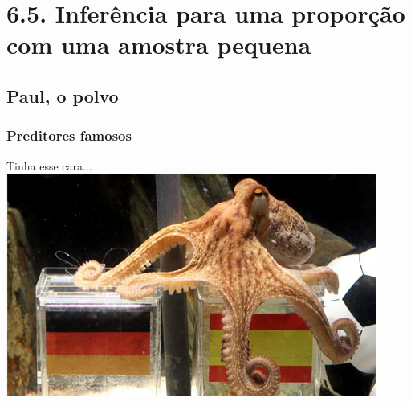 
\section{6.5. Inferência para uma proporção com uma amostra pequena}


\subsection{Paul, o polvo}


\begin{frame}
\frametitle{Preditores famosos}

{
\pause
Tinha esse cara...
\includegraphics[width=\textwidth]{6-5_small_single_prop/paul.png}
}

\end{frame}

